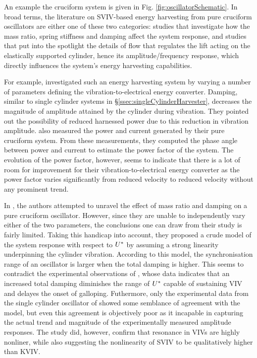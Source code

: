 \documentclass[oneside]{utmthesis}
\begin{document}
An example the cruciform system is given in Fig. \ref{fig:oscillatorSchematic}. In broad terms, the literature on SVIV-based energy harvesting from pure cruciform oscillators are either one of these two categories: studies that investigate how the mass ratio, spring stiffness and damping affect the system response, and studies that put into the spotlight the details of flow that regulates the lift acting on the elastically supported cylinder, hence its amplitude/frequency response, which directly influences the system's energy harvesting capabilities.

For example, \citet{Koide2009} investigated such an energy harvesting system by varying a number of parameters defining the vibration-to-electrical energy converter. Damping, similar to single cylinder systems in \S\ref{ssec:singleCylinderHarvester}, decreases the magnitude of amplitude attained by the cylinder during vibration. They pointed out the possibility of reduced harnessed power due to this reduction in vibration amplitude. \citet{Koide2009} also measured the power and current generated by their pure cruciform system. From these measurements, they computed the phase angle between power and current to estimate the power factor of the system. The evolution of the power factor, however, seems to indicate that there is a lot of room for improvement for their vibration-to-electrical energy converter as the power factor varies significantly from reduced velocity to reduced velocity without any prominent trend.

In \citet{Nguyen2012}, the authors attempted to unravel the effect of mass ratio and damping on a pure cruciform oscillator. However, since they are unable to independently vary either of the two parameters, the conclusions one can draw from their study is fairly limited. Taking this handicap into account, they proposed a crude model of the system response with respect to $U^{*}$ by assuming a strong linearity underpinning the cylinder vibration. According to this model, the synchronisation range of an oscillator is larger when the total damping is higher. This seems to contradict the experimental observations of \citet{Sun2016}, whose data indicates that an increased total damping diminishes the range of $U^{*}$ capable of sustaining VIV and delayes the onset of galloping. Futhermore, only the experimental data from the single cylinder oscillator of \citet{Nguyen2012} showed some semblance of agreement with the model, but even this agreement is objectively poor as it incapable in capturing the actual trend and magnitude of the experimentally measured amplitude responses. The study did, however, confirm that resonance in VIVs are highly nonliner, while also suggesting the nonlinearity of SVIV to be qualitatively higher than KVIV. 
\end{document}
